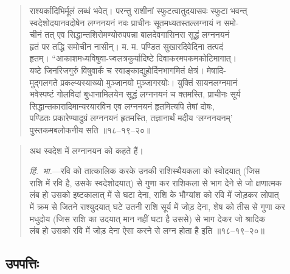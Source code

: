 \documentclass[11pt,a4paper]{article}
\newcommand{\dev}[1]{{\devanagarifont #1}}
\newenvironment{shloka}{%
  \begin{quote}
  \small
  \setlength{\leftmargin}{2em}
  \devanagarifont
}{\end{quote}}
\newenvironment{vyakhya}{%
  \begin{quote}
  \small
  \setlength{\leftmargin}{1em}
  \devanagarifont
}{\end{quote}}
\newcommand{\skt}[1]{{\devanagarifont #1}}
\begin{document}
\begin{shloka}
\skt{राश्यर्कादिभिर्मूलं लब्धं भवेत्। परन्तु राशीनां स्फुटत्वातुदयासवः स्फुटा भवन्त्}\\
\skt{स्वदेशोदयानवदोषेन लग्ननयनं नवः प्राचीनः सूतमध्यतस्तल्लग्नायं न समो-}\\
\skt{चीनं तत् एव सिद्धान्तशिरोमण्योरुपपन्ना बालदेवगासिनरा सूद्धं लग्ननयनं}\\
\skt{हृतं पर तद्धि समोचीन नासीन्। म. म. पण्डित सुखारदिवेदिना तत्पदं}\\
\skt{हृतम्। ``आकाशमध्यविषुवा-ज्वलत्रकुर्यादिष्टे दिवाकरमपकमकोटिमागात्।}\\
\skt{यष्टे जिनरिजगुरुं विषुवार्कं च स्वाङ्काद्युहोर्दिनभागमितं क्षेत्रं। मेषादि-}\\
\skt{मुद्गलगते प्रकल्प्यस्याख्यो मुञ्जानयो मुञ्जागरयोः। युक्तिं सायनलग्नमानं}\\
\skt{भवेस्पष्टं गोलविदां बुधानामिलयेन सूद्धं लग्ननयनं च क्तमस्ति, प्राचीनः सूर्य}\\
\skt{सिद्धान्तकारादिमान्यरयारविन एव लग्ननयनं हृतमित्यपि तेषां दोषः,}\\
\skt{पण्डितः प्रकारेण्यादुग्रं लग्ननयनं हृतमस्ति, तज्ञानार्थं मदीय ‘लग्ननयनम्’}\\
\skt{पुस्तकमबलोकनीय सति ॥१८--१९--२०॥}
\end{shloka}

\begin{vyakhya}
\skt{अथ स्वदेश में लग्नानयन को कहते हैं।}

\textit{हिं.\ भा.}—\skt{रवि को तात्कालिक करके उनकी राशिस्थैयकला को स्वोदयात् (जिस}\\
\skt{राशि में रवि है, उसके स्वदेशोदयात्) से गुणा कर राशिकला से भाग देने से जो क्षणात्मक}\\
\skt{लंब हो उसको इष्टकालात् में से घटा देना, राशि के भौग्यांश को रवि में जोड़कर लोपात्}\\
\skt{में क्रम से जितने राश्युदयात् घटे उतनी राशि सूर्य में जोड़ देना, शेष को तीस से गुणा कर}\\
\skt{मधुदोय (जिस राशि का उदयात् मान नहीं घटा है उससे) से भाग देकर जो श्रादिक}\\
\skt{लंब हो उसको रवि में जोड़ देना ऐसा करने से लग्न होता है इति ॥१८--१९--२०॥}
\end{vyakhya}

\subsection{\dev{उपपत्तिः}}
\end{document}
